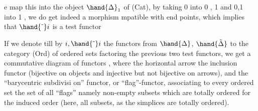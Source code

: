 
e map this into the object $\hand{\Delta}_1$ of (Cat), by taking \hand{\{}0\hand{\}} into 0 ,
\hand{\{}1\hand{\}} and \hand{\{}0,1\hand{\}} into 1 , we do get indeed a morphism mpatible with end
points, which implies that $\hand{\tilde{\ }}i$ is a test functor 

If we denote till by $i,\hand{\tilde{\ }}i$ the functors from $\hand{\Delta}$, $\hand{\tilde{\Delta}}$ to the category
(Ord) of ordered sets factoring the previous two test functors, we get a
commutative diagram of functors
,
where the  horizontal arrow  the inclusion functor (bijective on objects\hand{,}
and injective but not bijective on arrows), and  the ``barycentric subdivisi%
on'' functor, or ``flag''-functor, associating to every ordered set the set
of all ``flags'' namely non-empty subsets which are totally ordered for the
induced order (here, all subsets, as the simplices are totally ordered).

